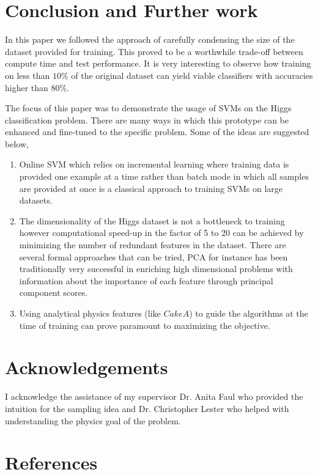 \documentclass[final,3p,times,twocolumn]{elsarticle}
\begin{document}
\section{Conclusion and Further work}

In this paper we followed the approach of carefully condensing the size of the dataset provided for training. This proved to be a worthwhile trade-off between compute time and    
test performance. It is very interesting to observe how training on less than $10\%$ of the original dataset can yield viable classifiers with accuracies higher than $80\%$. 

The focus of this paper was to demonstrate the usage of SVMs on the Higgs classification problem. There are many ways in which this prototype can be enhanced and fine-tuned to the specific problem. Some of the ideas are suggested below, 

\begin{enumerate}
\item Online SVM which relies on incremental learning where training data is provided one example at a time rather than batch mode in which all samples are provided at once is a classical approach to training SVMs on large datasets. 
\item The dimensionality of the Higgs dataset is not a bottleneck to training however computational speed-up in the factor of 5 to 20 can be achieved by minimizing the number of redundant features in the dataset. There are several formal approaches that can be tried, PCA for instance has been traditionally very successful in enriching high dimensional problems with information about the importance of each feature through principal component scores.
\item Using analytical physics features (like $CakeA$) to guide the algorithms at the time of training can prove paramount to maximizing the objective.  
\end{enumerate}

\label{conclusion}

\section*{Acknowledgements}

I acknowledge the assistance of my supervisor Dr. Anita Faul who provided the intuition for the sampling idea and Dr. Christopher Lester who helped with understanding the physics goal of the problem. 

\section*{References}
 

\end{document}
